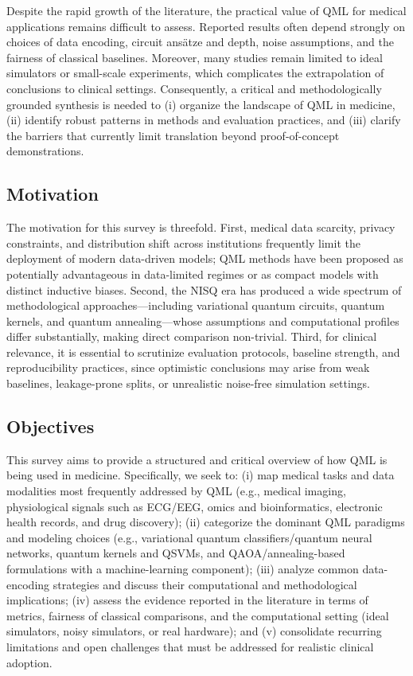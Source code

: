 \documentclass[pdflatex,bst/sn-mathphys-num]{sn-jnl}
\begin{document}
Despite the rapid growth of the literature, the practical value of QML for medical applications remains difficult to assess. Reported results often depend strongly on choices of data encoding, circuit ans\"atze and depth, noise assumptions, and the fairness of classical baselines. Moreover, many studies remain limited to ideal simulators or small-scale experiments, which complicates the extrapolation of conclusions to clinical settings. Consequently, a critical and methodologically grounded synthesis is needed to (i) organize the landscape of QML in medicine, (ii) identify robust patterns in methods and evaluation practices, and (iii) clarify the barriers that currently limit translation beyond proof-of-concept demonstrations.

\subsection{Motivation}\label{sec:motivation}

The motivation for this survey is threefold. First, medical data scarcity, privacy constraints, and distribution shift across institutions frequently limit the deployment of modern data-driven models; QML methods have been proposed as potentially advantageous in data-limited regimes or as compact models with distinct inductive biases. Second, the NISQ era has produced a wide spectrum of methodological approaches---including variational quantum circuits, quantum kernels, and quantum annealing---whose assumptions and computational profiles differ substantially, making direct comparison non-trivial. Third, for clinical relevance, it is essential to scrutinize evaluation protocols, baseline strength, and reproducibility practices, since optimistic conclusions may arise from weak baselines, leakage-prone splits, or unrealistic noise-free simulation settings.

\subsection{Objectives}\label{sec:objectives}

This survey aims to provide a structured and critical overview of how QML is being used in medicine. Specifically, we seek to:
(i) map medical tasks and data modalities most frequently addressed by QML (e.g., medical imaging, physiological signals such as ECG/EEG, omics and bioinformatics, electronic health records, and drug discovery);
(ii) categorize the dominant QML paradigms and modeling choices (e.g., variational quantum classifiers/quantum neural networks, quantum kernels and QSVMs, and QAOA/annealing-based formulations with a machine-learning component);
(iii) analyze common data-encoding strategies and discuss their computational and methodological implications;
(iv) assess the evidence reported in the literature in terms of metrics, fairness of classical comparisons, and the computational setting (ideal simulators, noisy simulators, or real hardware);
and (v) consolidate recurring limitations and open challenges that must be addressed for realistic clinical adoption.
\end{document}
